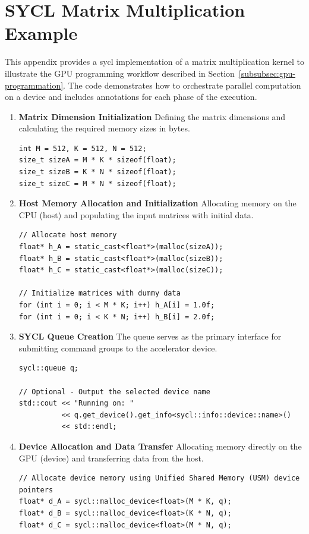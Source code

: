 \clearpage
\appendix
\section{SYCL Matrix Multiplication Example}
\label{appendix:sycl-matmul}
 
This appendix provides a \acrshort{sycl} implementation of a matrix multiplication kernel to illustrate the GPU programming workflow described in Section~\ref{subsubsec:gpu-programmation}. The code demonstrates how to orchestrate parallel computation on a device and includes annotations for each phase of the execution.

\begin{enumerate}
    \item \textbf{Matrix Dimension Initialization}
    Defining the matrix dimensions and calculating the required memory sizes in bytes.
\begin{lstlisting}
int M = 512, K = 512, N = 512;
size_t sizeA = M * K * sizeof(float);
size_t sizeB = K * N * sizeof(float);
size_t sizeC = M * N * sizeof(float);
\end{lstlisting}

    \item \textbf{Host Memory Allocation and Initialization}
    Allocating memory on the CPU (host) and populating the input matrices with initial data.
\begin{lstlisting}
// Allocate host memory
float* h_A = static_cast<float*>(malloc(sizeA));
float* h_B = static_cast<float*>(malloc(sizeB));
float* h_C = static_cast<float*>(malloc(sizeC));

// Initialize matrices with dummy data
for (int i = 0; i < M * K; i++) h_A[i] = 1.0f;
for (int i = 0; i < K * N; i++) h_B[i] = 2.0f;
\end{lstlisting}

    \item \textbf{SYCL Queue Creation}
    The queue serves as the primary interface for submitting command groups to the accelerator device.
\begin{lstlisting}
sycl::queue q;

// Optional - Output the selected device name
std::cout << "Running on: " 
          << q.get_device().get_info<sycl::info::device::name>() 
          << std::endl;
\end{lstlisting}

    \item \textbf{Device Allocation and Data Transfer}
    Allocating memory directly on the GPU (device) and transferring data from the host.
\begin{lstlisting}
// Allocate device memory using Unified Shared Memory (USM) device pointers
float* d_A = sycl::malloc_device<float>(M * K, q);
float* d_B = sycl::malloc_device<float>(K * N, q);
float* d_C = sycl::malloc_device<float>(M * N, q);


\end{lstlisting}
\end{enumerate}

